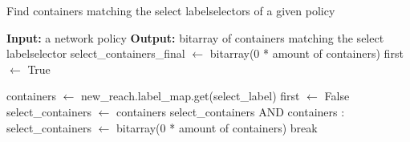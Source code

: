 \begin{algorithm}
    \caption{Find containers matching the select labelselectors of a given policy}
    \label{algo:select}
    \begin{algorithmic}[1]
    \State \textbf{Input:} a network policy
    \State \textbf{Output:} bitarray of containers matching the select labelselector
    \State 
    \State  select\_containers\_final $\gets$ bitarray(0 * amount of containers)
    \State first $\gets$ True

        \State containers $\gets$ new\_reach.label\_map.get(select\_label)
                \State first $\gets$ False
                \State select\_containers $\gets$ containers
            \Else
                \State select\_containers AND containers
            \EndIf
        \Else:
            \State select\_containers $\gets$ bitarray(0 * amount of containers)
            \State break
        \EndIf
    \EndFor

  \end{algorithmic}
\end{algorithm}